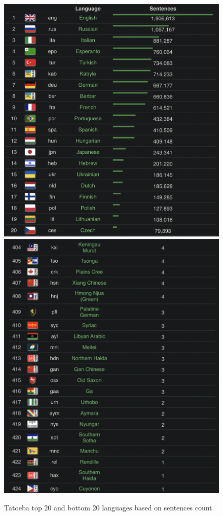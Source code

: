 \documentclass[a4paper]{article}
\begin{document}
\begin{figure}[htbp]
    \centering
    \includegraphics[width=0.5\linewidth]{images/tatoeba_top_20_lang.png}
    \includegraphics[width=0.46\linewidth]{images/tatoeba_bottom_20_lang.png}
    \caption{Tatoeba top 20 and bottom 20 languages based on sentences count \cite{tatoeba}}
    \label{fig:tatoeba_top_bottom_languages}
\end{figure}
\end{document}
